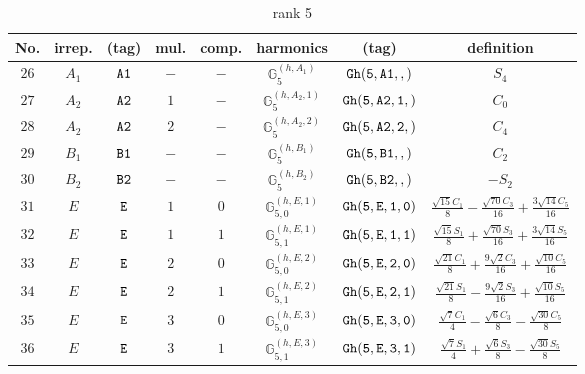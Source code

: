 \documentclass[fleqn,8pt]{jsarticle}
\begin{document}
\begin{table}[ht!]
\begin{center}
\caption{rank 5}
\renewcommand{\arraystretch}{1.3}
\begin{tabular}{cccccccc} \hline \hline
No. & irrep. & (tag) & mul. & comp. & harmonics & (tag) & definition \\ \hline
$ 26 $ & $ A_{1} $ & $ {\tt A1} $ & $ - $ & $ - $ & $ \mathbb{G}_{5}^{(h,A_{1})} $ & $ {\tt Gh(5,A1,,)} $ & $ S_{4} $ \\
$ 27 $ & $ A_{2} $ & $ {\tt A2} $ & $ 1 $ & $ - $ & $ \mathbb{G}_{5}^{(h,A_{2},1)} $ & $ {\tt Gh(5,A2,1,)} $ & $ C_{0} $ \\
$ 28 $ & $ A_{2} $ & $ {\tt A2} $ & $ 2 $ & $ - $ & $ \mathbb{G}_{5}^{(h,A_{2},2)} $ & $ {\tt Gh(5,A2,2,)} $ & $ C_{4} $ \\
$ 29 $ & $ B_{1} $ & $ {\tt B1} $ & $ - $ & $ - $ & $ \mathbb{G}_{5}^{(h,B_{1})} $ & $ {\tt Gh(5,B1,,)} $ & $ C_{2} $ \\
$ 30 $ & $ B_{2} $ & $ {\tt B2} $ & $ - $ & $ - $ & $ \mathbb{G}_{5}^{(h,B_{2})} $ & $ {\tt Gh(5,B2,,)} $ & $ - S_{2} $ \\
$ 31 $ & $ E $ & $ {\tt E} $ & $ 1 $ & $ 0 $ & $ \mathbb{G}_{5,0}^{(h,E,1)} $ & $ {\tt Gh(5,E,1,0)} $ & $ \frac{\sqrt{15} C_{1}}{8} - \frac{\sqrt{70} C_{3}}{16} + \frac{3 \sqrt{14} C_{5}}{16} $ \\
$ 32 $ & $ E $ & $ {\tt E} $ & $ 1 $ & $ 1 $ & $ \mathbb{G}_{5,1}^{(h,E,1)} $ & $ {\tt Gh(5,E,1,1)} $ & $ \frac{\sqrt{15} S_{1}}{8} + \frac{\sqrt{70} S_{3}}{16} + \frac{3 \sqrt{14} S_{5}}{16} $ \\
$ 33 $ & $ E $ & $ {\tt E} $ & $ 2 $ & $ 0 $ & $ \mathbb{G}_{5,0}^{(h,E,2)} $ & $ {\tt Gh(5,E,2,0)} $ & $ \frac{\sqrt{21} C_{1}}{8} + \frac{9 \sqrt{2} C_{3}}{16} + \frac{\sqrt{10} C_{5}}{16} $ \\
$ 34 $ & $ E $ & $ {\tt E} $ & $ 2 $ & $ 1 $ & $ \mathbb{G}_{5,1}^{(h,E,2)} $ & $ {\tt Gh(5,E,2,1)} $ & $ \frac{\sqrt{21} S_{1}}{8} - \frac{9 \sqrt{2} S_{3}}{16} + \frac{\sqrt{10} S_{5}}{16} $ \\
$ 35 $ & $ E $ & $ {\tt E} $ & $ 3 $ & $ 0 $ & $ \mathbb{G}_{5,0}^{(h,E,3)} $ & $ {\tt Gh(5,E,3,0)} $ & $ \frac{\sqrt{7} C_{1}}{4} - \frac{\sqrt{6} C_{3}}{8} - \frac{\sqrt{30} C_{5}}{8} $ \\
$ 36 $ & $ E $ & $ {\tt E} $ & $ 3 $ & $ 1 $ & $ \mathbb{G}_{5,1}^{(h,E,3)} $ & $ {\tt Gh(5,E,3,1)} $ & $ \frac{\sqrt{7} S_{1}}{4} + \frac{\sqrt{6} S_{3}}{8} - \frac{\sqrt{30} S_{5}}{8} $ \\
 \hline \hline
\end{tabular}
\end{center}
\end{table}
\end{document}

